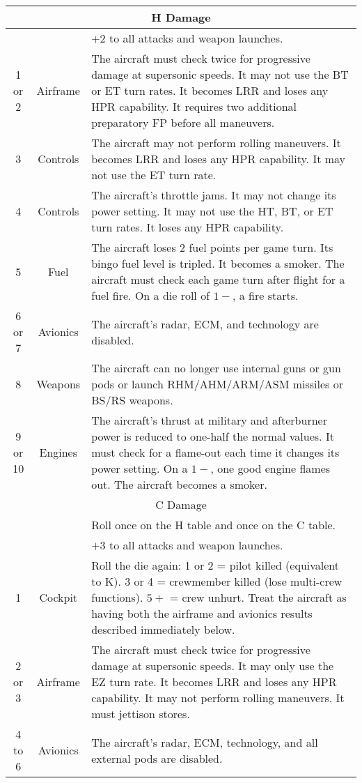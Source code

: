 {\begin{twocolumntable}
{\begin{tabularx}{\linewidth}{ccX}
\multicolumn{3}{c}{H Damage}\\
\midrule
&&+2 to all attacks and weapon launches.\\
\cmidrule{3-3}
1 or 2&Airframe&
The aircraft must check twice for progressive damage at supersonic speeds.
It may not use the BT or ET turn rates.
It becomes LRR and loses any HPR capability.
It requires two additional preparatory FP before all maneuvers.
\\
3&Controls&
The aircraft may not perform rolling maneuvers. 
It becomes LRR and loses any HPR capability.
It may not use the ET turn rate.
\\
4&Controls&
The aircraft's throttle jams. 
It may not change its power setting.
It may not use the HT, BT, or ET turn rates.
It loses any HPR capability.
\\
5&Fuel&
The aircraft loses 2 fuel points per game turn. 
Its bingo fuel level is tripled. 
It becomes a smoker.
The aircraft must check each game turn after flight for a fuel fire. On a die roll of $1-$, a fire starts.
\\
6 or 7&Avionics&
The aircraft's radar, ECM, and technology are disabled.
\\
8&Weapons&
The aircraft can no longer use internal guns or gun pods or launch RHM/AHM/ARM/ASM missiles or BS/RS weapons.
\\
9 or 10&Engines&
The aircraft's thrust at military and afterburner power is reduced to one-half the normal values.
It must check for a flame-out each time it changes its power setting. On a $1-$, one good engine flames out.
The aircraft becomes a smoker.
\\
\midrule
\multicolumn{3}{c}{C Damage}\\
\midrule
&&Roll once on the H table and once on the C table.\\
&&$+3$ to all attacks and weapon launches.\\
\cmidrule{3-3}
1&Cockpit&
Roll the die again: 1 or 2 = pilot killed (equivalent to K). 3 or 4 = crewmember killed (lose multi-crew functions). $5+$ = crew unhurt. 
Treat the aircraft as having both the airframe and avionics results described immediately below.
\\
2 or 3&Airframe&
The aircraft must check twice for progressive damage at supersonic speeds.
It may only use the EZ turn rate.
It becomes LRR and loses any HPR capability.
It may not perform rolling maneuvers. 
It must jettison stores.
\\
4 to 6&Avionics&
The aircraft's radar, ECM, technology, and all external pods are disabled.

\end{tabularx}}
\end{twocolumntable}}
